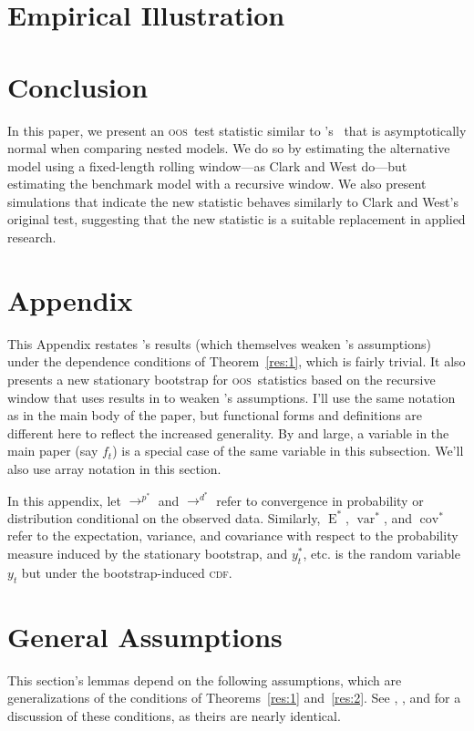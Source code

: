 \documentclass[12pt]{article}
\newcommand\citepos[2][]{\citeauthor{#2}'s \citeyearpar[#1]{#2}}
\newcommand\poscw{\citeauthor{ClW:06}'s \citeyearpar{ClW:06,ClW:07}}
\theoremstyle{definition}
\DeclareMathOperator{\E}{E}
\DeclareMathOperator{\var}{var}
\DeclareMathOperator{\cov}{cov}
\newcommand{\oos}{\textsc{oos}}
\newcommand{\cdf}{\textsc{cdf}}
\begin{document}
\section{Empirical Illustration}\label{sec:3}

\section{Conclusion}\label{sec:4}
In this paper, we present an \oos\ test statistic similar to \poscw\
that is asymptotically normal when comparing nested models.  We do so
by estimating the alternative model using a fixed-length rolling
window---as Clark and West do---but estimating the benchmark model
with a recursive window.  We also present simulations that indicate
the new statistic behaves similarly to Clark and West's original test,
suggesting that the new statistic is a suitable replacement in applied
research.  

\appendix
\section*{Appendix}

This Appendix restates \citepos{Mcc:00} results (which themselves
weaken \citepos{Wes:96} assumptions) under the dependence conditions of
Theorem~\ref{res:1}, which is fairly trivial.  It also presents a new
stationary bootstrap for \oos\ statistics based on the recursive
window that uses results in \citet{GoJ:03} to weaken \citepos{CoS:07}
assumptions.  I'll use the same notation as in the main body of the
paper, but functional forms and definitions are different here to
reflect the increased generality.  By and large, a variable in the
main paper (say $f_t$) is a special case of the same variable in this
subsection.  We'll also use array notation in this section.

In this appendix, let $\to^{p^{*}}$ and $\to^{d^{*}}$ refer to
convergence in probability or distribution conditional on the observed
data.  Similarly, $\E^{*}$, $\var^{*}$, and $\cov^{*}$ refer to the
expectation, variance, and covariance with respect to the probability
measure induced by the stationary bootstrap, and $y_t^{*}$, etc. is
the random variable $y_t$ but under the bootstrap-induced \cdf.

\section{General Assumptions}

This section's lemmas depend on the following assumptions, which are
generalizations of the conditions of Theorems~\ref{res:1}
and~\ref{res:2}.  See \citet{Wes:96,Wes:06}, \citet{WeM:98}, and
\citet{Mcc:00} for a discussion of these conditions, as theirs are
nearly identical.
\end{document}
